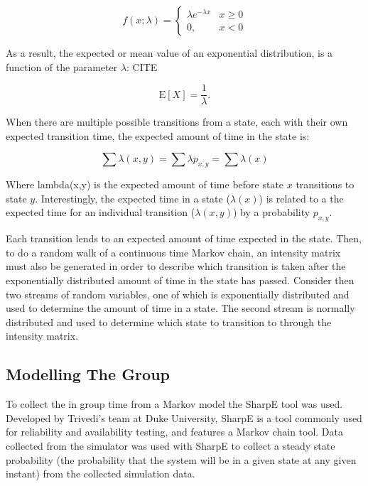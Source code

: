 \begin{equation}
f(x;\lambda) = \begin{cases}
\lambda e^{-\lambda x} & x \ge 0 \\
0, & x < 0
\end{cases}
\end{equation}

As a result, the expected or mean value of an exponential distribution, is a function of
the parameter $\lambda$: CITE

\begin{equation}
\mathrm{E}[X] = \frac{1}{\lambda}. \!
\end{equation}

When there are multiple possible transitions from a state, each with their own
expected transition time, the expected amount of time in the state is:

\begin{equation}
\sum \lambda(x,y) = \sum \lambda p_{x,y} = \sum \lambda(x)
\end{equation}

Where lambda(x,y) is the expected amount of time before state $x$ transitions to
state $y$. Interestingly, the expected time in a state ($\lambda(x)$) is related
to a the expected time for an individual transition ($\lambda(x,y)$) by a probability
$p_{x,y}$.

Each transition lends to an expected amount of time expected in the state. Then,
to do a random walk of a continuous time Markov chain, an intensity matrix must
also be generated in order to describe which transition is taken after the
exponentially distributed amount of time in the state has passed. Consider then
two streams of random variables, one of which is exponentially distributed and
used to determine the amount of time in a state. The second stream is normally
distributed and used to determine which state to transition to through the
intensity matrix.

\subsection{Modelling The Group}

To collect the in group time from a Markov model the SharpE tool was used.
Developed by Trivedi's team at Duke University, SharpE is a tool commonly used
for reliability and availability testing, and features a Markov chain tool. Data
collected from the simulator was used with SharpE to collect a steady state
probability (the probability that the system will be in a given state at any
given instant) from the collected simulation data.

